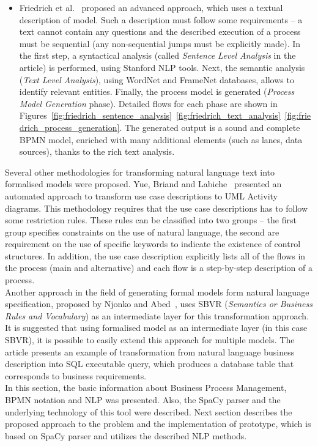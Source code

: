 \begin{itemize}
\item Friedrich et al.~\cite{friedrich-2011} proposed an advanced approach, which uses a textual description of model. Such a description must follow some requirements -- a text cannot contain any questions and the described execution of a process must be sequential (any non-sequential jumps must be explicitly made). In the first step, a syntactical analysis (called \emph{Sentence Level Analysis} in the article) is performed, using Stanford NLP tools. Next, the semantic analysis (\emph{Text Level Analysis}), using WordNet and FrameNet databases, allows to identify relevant entities. Finally, the process model is generated (\emph{Process Model Generation} phase). Detailed flows for each phase are shown in Figures~\ref{fig:friedrich_sentence_analysis}~\ref{fig:friedrich_text_analysis}~\ref{fig:friedrich_process_generation}. The generated output is a sound and complete BPMN model, enriched with many additional elements (such as lanes, data sources), thanks to the rich text analysis. 
\end{itemize}
Several other methodologies for transforming natural language text into formalised models were proposed. Yue, Briand and Labiche~\cite{yue-2010} presented an automated approach to transform use case descriptions to UML Activity diagrams. This methodology requires that the use case descriptions has to follow some restriction rules. These rules can be classified into two groups -- the first group specifies constraints on the use of natural language, the second are requirement on the use of specific keywords to indicate the existence of control structures. In addition, the use case description explicitly lists all of the flows in the process (main and alternative) and each flow is a step-by-step description of a process.\\
Another approach in the field of generating formal models form natural language specification, proposed by Njonko and Abed~\cite{from-nl-to-model-via-sbvr}, uses SBVR (\emph{Semantics or Business Rules and Vocabulary}) as an intermediate layer for this transformation approach. It is suggested that using formalised model as an intermediate layer (in this case SBVR), it is possible to easily extend this approach for multiple models. The article presents an example of transformation from natural language business description into SQL executable query, which produces a database table that corresponds to business requirements.\\
In this section, the basic information about Business Process Management, BPMN notation and NLP was presented. Also, the SpaCy parser and the underlying technology of this tool were described. Next section describes the proposed approach to the problem and the implementation of prototype, which is based on SpaCy parser and utilizes the described NLP methods.
